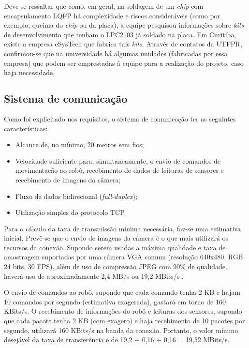 Deve-se ressaltar que como, em geral, na soldagem de um \textit{chip} com encapsulamento LQFP há complexidade e riscos consideráveis (como por exemplo, queima do \textit{chip} ou da placa), a equipe pesquisou informações sobre \textit{kits} de desenvolvimento que tenham o LPC2103 já soldado na placa. Em Curitiba, existe a empresa eSysTech \cite{esystech} que fabrica tais \textit{kits}. Através de contatos da UTFPR, confirmou-se que na universidade há algumas unidades (fabricadas por essa empresa) que podem ser emprestadas à equipe para a realização do projeto, caso haja necessidade.


\subsection{Sistema de comunicação}

Como foi explicitado nos requisitos, o sistema de comunicação ter as seguintes características:

\begin{itemize}
  \item Alcance de, no mínimo, 20 metros sem fios;
  \item Velocidade suficiente para, simultaneamente, o envio de comandos de movimentação ao robô, recebimento de dados de leituras de sensores e recebimento de imagens da câmera;
  \item Fluxo de dados bidirecional (\textit{full-duplex});
  \item Utilização simples do protocolo TCP.
\end{itemize}

Para o cálculo da taxa de transmissão mínima necessária, faz-se uma estimativa inicial. Prevê-se que o envio de imagens da câmera é o que mais utilizará os recursos da conexão. Supondo serem usadas a máxima qualidade e taxa de amostragem suportadas por uma câmera VGA comum (resolução 640x480, RGB 24 bits, 30 FPS), além de uso de compressão JPEG com 90\% de qualidade, haverá uso de aproximadamente 2,4 MB/s ou 19,2 MBits/s \cite{webcam_resolution}. 

O envio de comandos ao robô, supondo que cada comando tenha 2 KB e hajam 10 comandos por segundo (estimativa exagerada), gastará em torno de 160 KBits/s. O recebimento de informações do robô e leituras dos sensores, supondo que cada pacote tenha 2 KB (com exagero) e haja recebimento de 10 pacotes por segundo, utilizará 160 KBits/s na banda da conexão. Portanto, o valor mínimo desejável da taxa de transferência é de 19,2 + 0,16 + 0,16 = 19,52 MBits/s.

